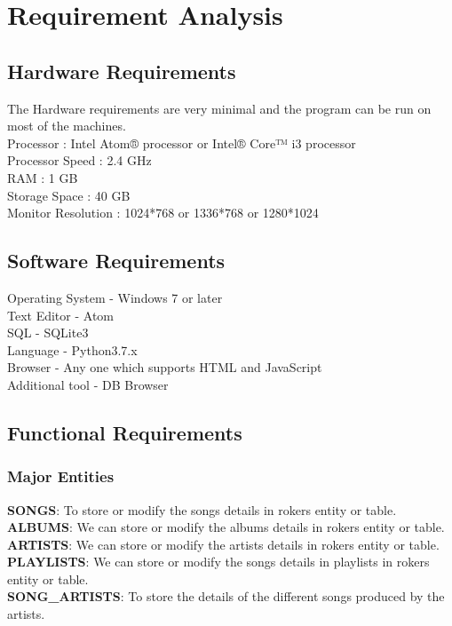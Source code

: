 \chapter{Requirement Analysis}

\section{Hardware Requirements}
The Hardware requirements are very minimal and the program can be run on most of
the machines. \\
Processor : Intel Atom® processor or Intel® Core™ i3 processor\\
Processor Speed : 2.4 GHz\\
RAM : 1 GB\\
Storage Space : 40 GB\\
Monitor Resolution : 1024*768 or 1336*768 or 1280*1024\\
\thispagestyle{fancy}

\section{Software Requirements}
Operating System - Windows 7 or later\\
Text Editor - Atom\\
SQL - SQLite3\\
Language - Python3.7.x\\
Browser - Any one which supports HTML and JavaScript\\
Additional tool - DB Browser\\
\thispagestyle{fancy}
\pagebreak
\section{Functional Requirements}
\subsection{Major Entities}
\textbf{SONGS}: To store or modify the songs details in rokers entity or table.\\
\textbf{ALBUMS}: We can store or modify the albums details in rokers entity or table.\\
\textbf{ARTISTS}: We can store or modify the artists details in rokers entity or table.\\
\textbf{PLAYLISTS}: We can store or modify the songs details in playlists in rokers entity or table.\\
\textbf{SONG_ARTISTS}: To store the details of the different songs produced by the artists.\\

